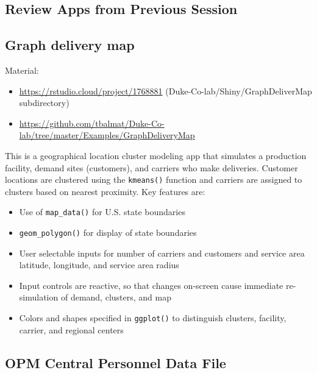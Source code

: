 \documentclass[10pt, letterpaper]{article}
\begin{document}
\begin{spacing}{1.0}

\section{Review Apps from Previous Session}\label{sec:reviewapps}
    
\subsection{Graph delivery map}\label{sec:reviewappGraphDeliveryMap}

Material:
\begin{itemize}
    \item \url{https://rstudio.cloud/project/1768881} (Duke-Co-lab/Shiny/GraphDeliverMap subdirectory)
    \item \url{https://github.com/tbalmat/Duke-Co-lab/tree/master/Examples/GraphDeliveryMap}
\end{itemize}

This is a geographical location cluster modeling app that simulates a production facility, demand sites (customers), and carriers who make deliveries.  Customer locations are clustered using the \texttt{kmeans()} function and carriers are assigned to clusters based on nearest proximity.  Key features are:

\begin{itemize}
    \item Use of \texttt{map\_data()} for U.S. state boundaries
    \item \texttt{geom\_polygon()} for display of state boundaries
    \item User selectable inputs for number of carriers and customers and service area latitude, longitude, and service area radius
    \item Input controls are reactive, so that changes on-screen cause immediate re-simulation of demand, clusters, and map
    \item Colors and shapes specified in \texttt{ggplot()} to distinguish clusters, facility, carrier, and regional centers
\end{itemize}


\subsection{OPM Central Personnel Data File}\label{sec:reviewappOPM}


\end{spacing}
\end{document}
